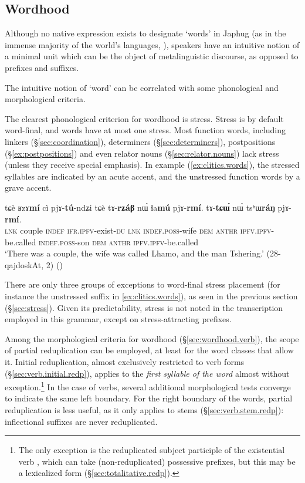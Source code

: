 \subsection{Wordhood} \label{sec:wordhood}
Although no native expression exists to designate `words' in Japhug (as in the immense majority of the world's languages, \citealt{dixon02word}), speakers have an intuitive notion of a minimal unit  which can be the object of metalinguistic discourse, as opposed to prefixes and suffixes.

The intuitive notion of `word' can be correlated with some phonological and morphological criteria.

The clearest phonological criterion for wordhood is stress. Stress is by default word-final, and words have at most one stress. Most function words, including linkers (§\ref{sec:coordination}), determiners (§\ref{sec:determiners}), postpositions (§\ref{ex:postpositions}) and even relator nouns (§\ref{sec:relator.nouns}) lack stress (unless they receive special emphasis). In example (\ref{ex:clitics.words}), the stressed syllables are indicated by an acute accent, and the unstressed function words by a grave accent.

\begin{exe}
	\ex \label{ex:clitics.words}
	\gll  tɕè ʁzɤ\textbf{mí} cì pjɤ-\textbf{tú}-ndʑi tɕè tɤ-\textbf{rʑáβ} nɯ̀ ɬa\textbf{mú} pjɤ-\textbf{rmí}. tɤ-\textbf{tɕɯ́} nɯ̀ tsʰɯ\textbf{ráŋ} pjɤ-\textbf{rmí}. \\
	\textsc{lnk} couple \textsc{indef} \textsc{ifr}.\textsc{ipfv}-exist-\textsc{du} \textsc{lnk} \textsc{indef}.\textsc{poss}-wife \textsc{dem}  \textsc{anthr} \textsc{ipfv}.\textsc{ipfv}-be.called \textsc{indef}.\textsc{poss}-son \textsc{dem}   \textsc{anthr} \textsc{ipfv}.\textsc{ipfv}-be.called  \\
	\glt `There was a couple, the wife was called Lhamo, and the man Tshering.' (28-qajdoskAt, 2)
	()
\end{exe}

There are only three groups of exceptions to word-final stress placement (for instance the unstressed suffix  in \ref{ex:clitics.words}), as seen in the previous section (§\ref{sec:stress}). Given its predictability, stress is not noted in the transcription employed in this grammar, except on stress-attracting prefixes.

Among the morphological criteria for wordhood (§\ref{sec:wordhood.verb}), the scope of partial reduplication can be employed, at least for the word classes that allow it. Initial reduplication, almost exclusively restricted to verb forms (§\ref{sec:verb.initial.redp}), applies to the \textit{first syllable of the word} almost without exception.\footnote{The only exception is the reduplicated subject participle  of the existential verb , which can take (non-reduplicated) possessive prefixes, but this may be a lexicalized form (§\ref{sec:totalitative.redp}). }   In the case of verbs, several additional morphological tests converge to indicate the same left boundary. For the right boundary of the words, partial reduplication is less useful, as it only applies to stems (§\ref{sec:verb.stem.redp}): inflectional suffixes are never reduplicated.

